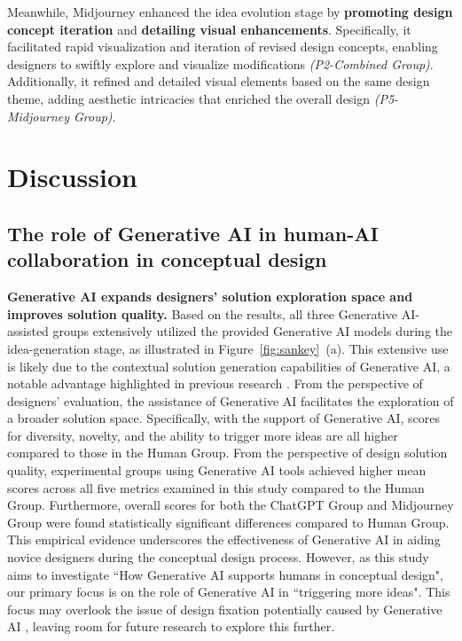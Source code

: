 \documentclass{dsj}
\begin{document}
Meanwhile, Midjourney enhanced the idea evolution stage by \textbf{promoting design concept iteration} and \textbf{detailing visual enhancements}. Specifically,  it facilitated rapid visualization and iteration of revised design concepts, enabling designers to swiftly explore and visualize modifications \textit{(P2-Combined Group)}. Additionally, it refined and detailed visual elements based on the same design theme, adding aesthetic intricacies that enriched the overall design \textit{(P5-Midjourney Group)}.


\section{Discussion}
\subsection{The role of Generative AI in human-AI collaboration in conceptual design}

\textbf{Generative AI expands designers’ solution exploration space and improves solution quality.} Based on the results, all three Generative AI-assisted groups extensively utilized the provided Generative AI models during the idea-generation stage, as illustrated in Figure~\ref{fig:sankey}~(a). This extensive use is likely due to the contextual solution generation capabilities of Generative AI, a notable advantage highlighted in previous research \citep{wu2024integrating, weisz2024design, lee2024and}. From the perspective of designers' evaluation, the assistance of Generative AI facilitates the exploration of a broader solution space. Specifically, with the support of Generative AI, scores for diversity, novelty, and the ability to trigger more ideas are all higher compared to those in the Human Group. From the perspective of design solution quality, experimental groups using Generative AI tools achieved higher mean scores across all five metrics examined in this study compared to the Human Group. Furthermore, overall scores for both the ChatGPT Group and Midjourney Group were found statistically significant differences compared to Human Group. This empirical evidence underscores the effectiveness of Generative AI in aiding novice designers during the conceptual design process. However, as this study aims to investigate ``How Generative AI supports humans in conceptual design", our primary focus is on the role of Generative AI in ``triggering more ideas". This focus may overlook the issue of design fixation potentially caused by Generative AI \citep{jansson1991design, wadinambiarachchi2024effects}, leaving room for future research to explore this further.
\end{document}
